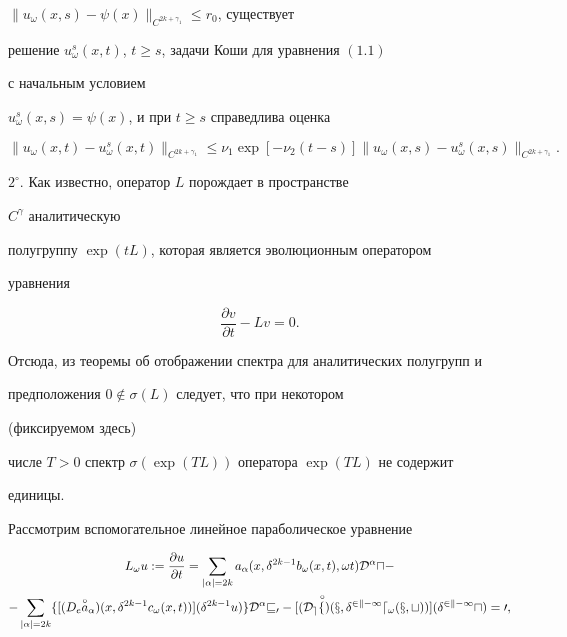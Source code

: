\begin{thm}
\begin{itemize}
$\|u_\omega(x,s)-\psi(x)\|_{C^{2k+\gamma_1}}\le r_0$, существует 


решение $u^s_\omega(x,t)$, $t\ge s$, задачи Коши для уравнения $(1.1)$ 


с начальным условием 


$u^s_\omega(x,s)=\psi(x)$, и при $t\ge s$ справедлива оценка 


$$ 


\|u_\omega(x,t)-u^s_\omega(x,t)\|_{C^{2k+\gamma_1}}\le 


\nu_1\exp[-\nu_2(t-s)]\|u_\omega(x,s)- 


u^s_\omega(x,s)\|_{C^{2k+\gamma_1}}. 


$$ 


\end{itemize} 


\end{thm} 


 


$2^\circ$. Как известно, оператор $L$ порождает в пространстве 


$C^\gamma$ аналитическую 


полугруппу $\exp(t L)$, которая является эволюционным оператором 


уравнения 


\begin{equation} 


\frac{\partial v}{\partial t}-L v=0. 


\end{equation} 


Отсюда, из теоремы об отображении спектра для аналитических полугрупп и 


предположения $0\notin\sigma(L)$ следует, что при некотором 


(фиксируемом здесь) 


числе $T>0$ спектр $\sigma(\exp(T L))$ оператора $\exp(T L)$ не содержит 


единицы. 


 


Рассмотрим вспомогательное линейное параболическое уравнение 


\begin{multline} 


L_\omega u:=\frac{\partial u}{\partial t} 


=\sum_{|\alpha|=2k}a_\alpha(x,\delta^{2k-1} 


b_\omega(x,t),\omega t)\cal D^\alpha u-\\ 


% 


-\sum_{|\alpha|=2k}\{[(D_e\up{\circ}{a}_\alpha) 


(x,\delta^{2k-1}c_\omega(x,t))] 


(\delta^{2k-1}u)\}\cal D^\alpha v_0- 


[(D_e\up{\,\circ}{f})(x,\delta^{2k-1}d_\omega(x,t))] 


(\delta^{2k-1}u)=0, 


\end{multline} 


